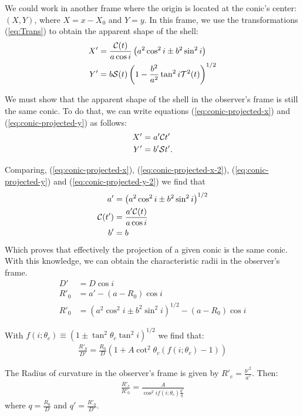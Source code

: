 We could work in another frame where the origin is located at the conic's center: $(X,Y)$, where $X=x-X_0$ and $Y=y$.
In this frame,  we use the transformations (\ref{eq:Trans})  to obtain the apparent shape of the shell:
\begin{align}
X' &= \frac{\mathcal{C}(t)}{a\cos i}\left(a^2\cos^2 i \pm b^2\sin^2 i\right)  \label{eq:conic-projected-x}\\
Y' &= b\mathcal{S}(t)\left(1-\frac{b^2}{a^2}\tan^2 i\mathcal{T}^2(t)\right)^{1/2}
\label{eq:conic-projected-y}
\end{align}


We must show that the apparent shape of the shell in the observer's frame is still the same conic. To do that, we can write equations
(\ref{eq:conic-projected-x}) and (\ref{eq:conic-projected-y}) as follows:
\begin{align}
X' &= a'\mathcal{C} t' \label{eq:conic-projected-x-2} \\
Y' &= b'\mathcal{S} t' \label{eq:conic-projected-y-2} . 
\end{align}

Comparing, (\ref{eq:conic-projected-x}), (\ref{eq:conic-projected-x-2}), (\ref{eq:conic-projected-y}) and (\ref{eq:conic-projected-y-2}) we find that
\begin{align}
a' &= \left(a^2\cos^2 i \pm b^2\sin^2 i\right)^{1/2} \\
\mathcal{C}(t') &= \frac{a'\mathcal{C}(t)}{a\cos i} \\
b' &= b \label{eq:b-prime}
\end{align} 
Which proves that effectively the projection of a given conic is the same conic. With this knowledge, we can obtain the characteristic radii in
the observer's frame.
\begin{align}
D' &= D\cos i \\
R'_0 &= a' - (a-R_0)\cos i \\
R'_0 &= \left(a^2\cos^2 i \pm b^2\sin^2 i\right)^{1/2}  - (a-R_0)\cos i
\end{align}

With  $f(i;\theta_c)\equiv\left(1\pm\tan^2\theta_c\tan^2i\right)^{1/2}$ we find that:
\begin{align}
\frac{R'_0}{D'}=\frac{R_0}{D}\left(1+A\cot^2\theta_c(f(i;\theta_c)-1) \right)
\end{align}

The Radius of curvature in the observer's frame is given by $R'_c=\frac{b'^2}{a'}$. Then:
\begin{align}
\frac{R'_c}{R'_0} = \frac{A}{\cos^2 i f(i;\theta_c)\frac{q'}{q}}
\end{align}
where $q=\frac{R_0}{D}$ and $q' = \frac{R'_0}{D'}$. 

